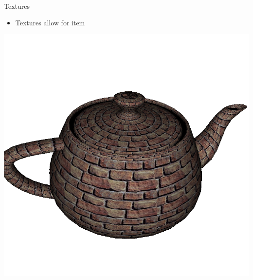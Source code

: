 \documentclass{lug}
\newcommand{\splitslide}[4]{
    \noindent
    \begin{minipage}{#1 \textwidth - #2 }
        #3
    \end{minipage}%
    \hspace{ \dimexpr #2 * 2 \relax }%
    \begin{minipage}{\textwidth - #1 \textwidth - #2 }
        #4
    \end{minipage}
}
\begin{document}
\begin{frame}{Textures}
    \splitslide{0.65}{.7em}{
        \small
        \begin{itemize}
            \item Textures allow for item
        \end{itemize}
    }{
        \includegraphics[width=\textwidth]{graphics/teapot_brick}
    }
\end{frame}
\end{document}
